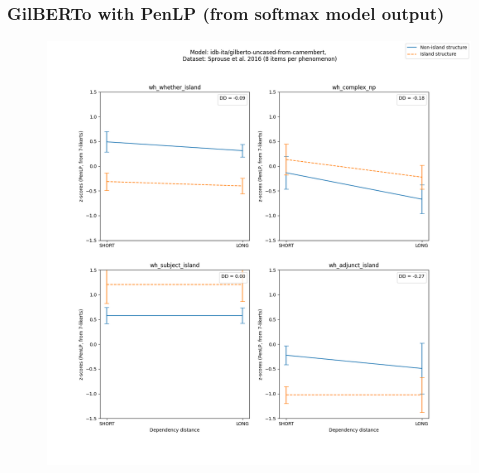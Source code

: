 \subsubsection{GilBERTo with PenLP (from softmax model output)}
\begin{figure}[h]
	\centering
	\includegraphics[width=1\textwidth]{images/Chapter1/Sprouse_wh_idb-ita_gilberto-uncased-from-camembert_PenLP-zscores-likert-2022-07-11.png} 
\end{figure}

\clearpage
